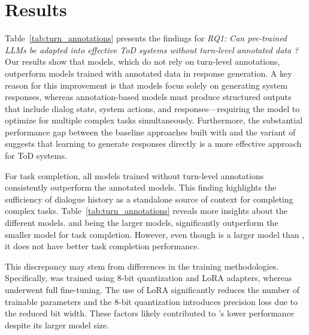 \vspace{-9pt}
\section{Results}
\vspace{-3pt}



\vspace{-5pt}
\noindent
\noindent
Table~\ref{tab:turn_annotations} presents the findings for \textit{RQ1: Can pre-trained LLMs be adapted into effective ToD systems without turn-level annotated data ?}
Our results show that {\oursys} models, which do not rely on turn-level annotations, outperform models trained with annotated data in response generation.
A key reason for this improvement is that {\oursys} models focus solely on generating system responses, whereas annotation-based models must produce structured outputs that include dialog state, system actions, and responses—requiring the model to optimize for multiple complex tasks simultaneously. 
Furthermore, the substantial performance gap between the baseline approaches built with {\gpt} and the {\gpt} variant of {\oursys} suggests that learning to generate responses directly is a more effective approach for ToD systems.

For task completion, all models trained without turn-level annotations consistently outperform the annotated models. This finding highlights the sufficiency of dialogue history as a standalone source of context for completing complex tasks. 
Table~\ref{tab:turn_annotations} reveals more insights about the different {\oursys} models.  {\flan} and {\llamai} being the larger models, significantly outperform the smaller {\gpt} model for task completion. 
However, even though {\llamai} is a larger model than {\flan}, it does not have better task completion performance. 

This discrepancy may stem from differences in the training methodologies. Specifically, {\llamai} was trained using 8-bit quantization and LoRA adapters, whereas {\flan} underwent full fine-tuning. The use of LoRA significantly reduces the number of trainable parameters and the 8-bit quantization introduces precision loss due to the reduced bit width. These factors likely contributed to {\llamai}'s lower performance despite its larger model size.

